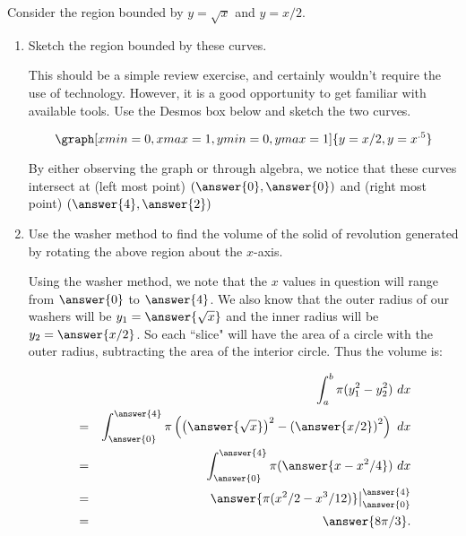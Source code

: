 \documentclass{ximera}
\begin{document}
\begin{question}
Consider the region bounded by $y=\sqrt{x}$ and $y=x/2$.
\begin{enumerate}
\item Sketch the region bounded by these curves.
\begin{explanation}
This should be a simple review exercise, and certainly wouldn't require the use of technology.  However, it is a good opportunity to get familiar with available tools.  Use the Desmos box below and sketch the two curves.

\begin{onlineOnly}
$$\graph[xmin=0,xmax=1, ymin=0, ymax=1]{y=x/2,y=x^{.5}}$$
\end{onlineOnly}

By either observing the graph or through algebra, we notice that these curves intersect at (left most point) $(\answer{0}, \answer{0})$ and (right most point) $(\answer{4}, \answer{2})$

\end{explanation}

\item Use the washer method to find the volume of the solid of revolution generated by rotating the above region about the $x$-axis.

\begin{explanation}
Using the washer method, we note that the $x$ values in question will range from $\answer{0}$ to $\answer{4}$.  We also know that the outer radius of our washers will be $y_1=\answer{\sqrt{x}}$ and the inner radius will be $y_2=\answer{x/2}$.  So each ``slice" will have the area of a circle with the outer radius, subtracting the area of the interior circle.  Thus the volume is:

\begin{eqnarray*}
&&\int_a^b \pi(y_1^2-y_2^2)\ dx\\
&=&\int_{\answer{0}}^{\answer{4}} \pi\left(   \left( \answer{\sqrt{x}}\right)^2  - \left( \answer{x/2}\right)^2   \right)\ dx\\
&=&\int_{\answer{0}}^{\answer{4}} \pi(\answer{x-x^2/4})\ dx\\
&=&\answer{\pi(x^2/2-x^3/12)}\big|_{\answer{0}}^{\answer{4}}\\
&=&\answer{8\pi/3}.
\end{eqnarray*}



\end{explanation}





\end{enumerate}
\end{question}
\end{document}
